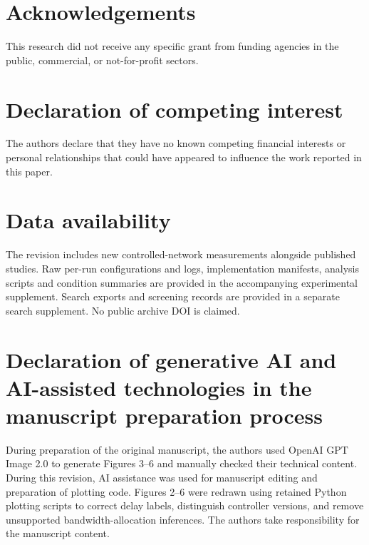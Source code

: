 \documentclass[a4paper,fleqn]{cas-sc}
\begin{document}
\section*{Acknowledgements}
This research did not receive any specific grant from funding agencies in the
public, commercial, or not-for-profit sectors.

\section*{Declaration of competing interest}
The authors declare that they have no known competing financial interests or
personal relationships that could have appeared to influence the work reported
in this paper.

\section*{Data availability}
The revision includes new controlled-network measurements alongside published
studies. Raw per-run configurations and logs, implementation manifests,
analysis scripts and condition summaries are provided in the accompanying
experimental supplement. Search exports and screening records are provided
in a separate search supplement. No public archive DOI is claimed.

\section*{Declaration of generative AI and AI-assisted technologies in the
manuscript preparation process}
During preparation of the original manuscript, the authors used OpenAI
GPT Image 2.0 to generate Figures 3--6 and manually checked their technical
content. During this revision, AI assistance was used for manuscript editing
and preparation of plotting code. Figures 2--6 were redrawn using retained
Python plotting scripts to correct delay labels, distinguish controller
versions, and remove unsupported bandwidth-allocation inferences.
The authors take responsibility for the manuscript content.

\printcredits



\end{document}
